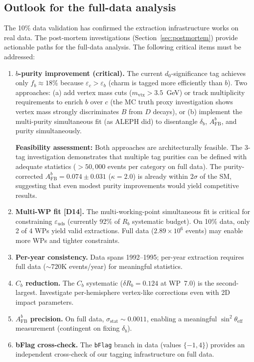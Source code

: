 \documentclass[11pt,a4paper]{article}
\begin{document}
\subsection{Outlook for the full-data analysis}
\label{sec:outlook}

The 10\% data validation has confirmed the extraction infrastructure works on real
data. The post-mortem investigations (Section~\ref{sec:postmortem}) provide actionable
paths for the full-data analysis. The following critical items must be addressed:

\begin{enumerate}
\item \textbf{$b$-purity improvement (critical).} The current $d_0$-significance tag
achieves only $f_b \approx 18\%$ because $\varepsilon_c > \varepsilon_b$ (charm is
tagged more efficiently than $b$). Two approaches:
(a) add vertex mass cuts ($m_\mathrm{vtx} > 3.5$~GeV) or track multiplicity requirements
to enrich $b$ over $c$ (the MC truth proxy investigation shows vertex mass strongly
discriminates $B$ from $D$ decays), or
(b) implement the multi-purity simultaneous fit (as ALEPH did) to disentangle
$\delta_b$, $A_\mathrm{FB}^b$, and purity simultaneously.

\textbf{Feasibility assessment:} Both approaches are architecturally feasible.
The 3-tag investigation demonstrates that multiple tag purities can be defined with
adequate statistics ($> 50{,}000$ events per category on full data). The
purity-corrected $A_\mathrm{FB}^b = 0.074 \pm 0.031$ ($\kappa = 2.0$) is already
within $2\sigma$ of the SM, suggesting that even modest purity improvements would
yield competitive results.

\item \textbf{Multi-WP fit [D14].} The multi-working-point simultaneous fit is
critical for constraining $\varepsilon_\mathrm{uds}$ (currently 92\% of $R_b$
systematic budget). On 10\% data, only 2 of 4 WPs yield valid extractions.
Full data ($2.89 \times 10^6$ events) may enable more WPs and tighter constraints.

\item \textbf{Per-year consistency.} Data spans 1992--1995; per-year extraction
requires full data ($\sim 720$K events/year) for meaningful statistics.

\item \textbf{$C_b$ reduction.} The $C_b$ systematic ($\delta R_b = 0.124$ at WP~7.0)
is the second-largest. Investigate per-hemisphere vertex-like corrections even
with 2D impact parameters.

\item \textbf{$A_\mathrm{FB}^b$ precision.} On full data,
$\sigma_\mathrm{stat} \sim 0.0011$, enabling a meaningful
$\sin^2\theta_\mathrm{eff}$ measurement (contingent on fixing $\delta_b$).

\item \textbf{bFlag cross-check.} The \texttt{bFlag} branch in data (values $\{-1, 4\}$)
provides an independent cross-check of our tagging infrastructure on full data.
\end{enumerate}
\end{document}
